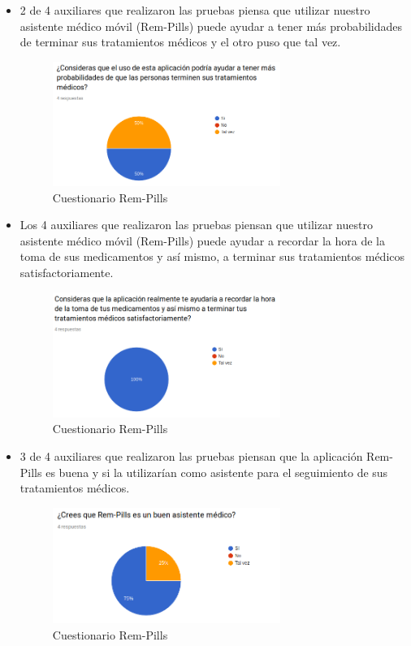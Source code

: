 \begin{itemize}
	
	\item 2 de 4 auxiliares que realizaron las pruebas piensa que utilizar nuestro asistente médico móvil (Rem-Pills) puede ayudar a tener más probabilidades de terminar sus tratamientos médicos y el otro puso que tal vez.
	
	\begin{figure}[htb]
		\centering
		\includegraphics[width=0.7\textwidth]{images/Pruebas/Aux1}
		\caption{Cuestionario Rem-Pills} 
		\label{fig:Aux1}
	\end{figure} 
	\item Los 4 auxiliares que realizaron las pruebas piensan que utilizar nuestro asistente médico móvil (Rem-Pills) puede ayudar a recordar la hora de la toma de sus medicamentos y así mismo, a terminar sus tratamientos médicos satisfactoriamente.
	\newpage
	\begin{figure}[htb]
		\centering
		\includegraphics[width=0.7\textwidth]{images/Pruebas/Aux2}
		\caption{Cuestionario Rem-Pills} 
		\label{fig:Aux2}
	\end{figure} 
	\item 3 de 4 auxiliares que realizaron las pruebas piensan que la aplicación Rem-Pills es buena y si la utilizarían como asistente para el seguimiento de sus tratamientos médicos.

	\begin{figure}[htb]
		\centering
		\includegraphics[width=0.7\textwidth]{images/Pruebas/Aux3}
		\caption{Cuestionario Rem-Pills} 
		\label{fig:Aux3}
	\end{figure} 
%	
\end{itemize}

